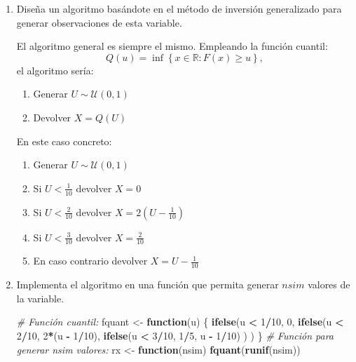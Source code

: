 \documentclass[]{book}
\newenvironment{Shaded}{\begin{snugshade}}{\end{snugshade}}
\newcommand{\KeywordTok}[1]{\textcolor[rgb]{0.13,0.29,0.53}{\textbf{#1}}}
\newcommand{\DecValTok}[1]{\textcolor[rgb]{0.00,0.00,0.81}{#1}}
\newcommand{\StringTok}[1]{\textcolor[rgb]{0.31,0.60,0.02}{#1}}
\newcommand{\CommentTok}[1]{\textcolor[rgb]{0.56,0.35,0.01}{\textit{#1}}}
\newcommand{\ControlFlowTok}[1]{\textcolor[rgb]{0.13,0.29,0.53}{\textbf{#1}}}
\newcommand{\OperatorTok}[1]{\textcolor[rgb]{0.81,0.36,0.00}{\textbf{#1}}}
\newcommand{\NormalTok}[1]{#1}
\theoremstyle{definition}
\theoremstyle{definition}
\theoremstyle{definition}
\theoremstyle{remark}
\begin{document}
\begin{enumerate}
\def\labelenumi{\alph{enumi})}
\item
  Diseña un algoritmo basándote en el método de inversión generalizado
  para generar observaciones de esta variable.

  El algoritmo general es siempre el mismo. Empleando la función
  cuantil:
  \[Q\left( u\right) = \inf \left\{ x\in \mathbb{R}:F\left( x\right) 
  \geq u\right\},\] el algoritmo sería:

  \begin{enumerate}
  \def\labelenumii{\arabic{enumii}.}
  \item
    Generar \(U\sim \mathcal{U}\left( 0,1\right)\)
  \item
    Devolver \(X=Q\left( U\right)\)
  \end{enumerate}

  En este caso concreto:

  \begin{enumerate}
  \def\labelenumii{\arabic{enumii}.}
  \item
    Generar \(U\sim \mathcal{U}\left( 0,1\right)\)
  \item
    Si \(U < \frac{1}{10}\) devolver \(X = 0\)
  \item
    Si \(U < \frac{2}{10}\) devolver \(X = 2(U - \frac{1}{10})\)
  \item
    Si \(U < \frac{3}{10}\) devolver \(X = \frac{2}{10}\)
  \item
    En caso contrario devolver \(X = U - \frac{1}{10}\)
  \end{enumerate}
\item
  Implementa el algoritmo en una función que permita generar \(nsim\)
  valores de la variable.

\begin{Shaded}
\begin{Highlighting}[]
\CommentTok{# Función cuantil:}
\NormalTok{fquant <-}\StringTok{ }\ControlFlowTok{function}\NormalTok{(u) \{}
\KeywordTok{ifelse}\NormalTok{(u }\OperatorTok{<}\StringTok{ }\DecValTok{1}\OperatorTok{/}\DecValTok{10}\NormalTok{, }\DecValTok{0}\NormalTok{,}
     \KeywordTok{ifelse}\NormalTok{(u }\OperatorTok{<}\StringTok{ }\DecValTok{2}\OperatorTok{/}\DecValTok{10}\NormalTok{, }\DecValTok{2}\OperatorTok{*}\NormalTok{(u }\OperatorTok{-}\StringTok{ }\DecValTok{1}\OperatorTok{/}\DecValTok{10}\NormalTok{),}
            \KeywordTok{ifelse}\NormalTok{(u }\OperatorTok{<}\StringTok{ }\DecValTok{3}\OperatorTok{/}\DecValTok{10}\NormalTok{, }\DecValTok{1}\OperatorTok{/}\DecValTok{5}\NormalTok{, u }\OperatorTok{-}\StringTok{ }\DecValTok{1}\OperatorTok{/}\DecValTok{10}\NormalTok{) ) )}
\NormalTok{\}}
\CommentTok{# Función para generar nsim valores:}
\NormalTok{rx <-}\StringTok{ }\ControlFlowTok{function}\NormalTok{(nsim) }\KeywordTok{fquant}\NormalTok{(}\KeywordTok{runif}\NormalTok{(nsim))}
\end{Highlighting}
\end{Shaded}


\end{enumerate}
\end{document}
